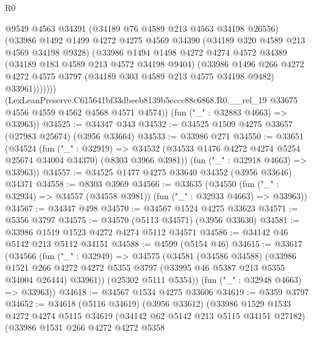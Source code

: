 \begin{lexlean}{R0}
\begin{coremodule}
                @9549
                @4563
                @34391
                (@34189 @76 @4589 @213 @4563 @34198 @26556)
                (@33986
                  @1492
                  @1499
                  @4272
                  @4275
                  @4569
                  @34390
                  (@34189 @320 @4589 @213 @4569 @34198 @9328)
                  (@33986
                    @1494
                    @1498
                    @4272
                    @4274
                    @4572
                    @34389
                    (@34189 @183 @4589 @213 @4572 @34198 @9404)
                    (@33986
                      @1496
                      @266
                      @4272
                      @4272
                      @4575
                      @3797
                      (@34189 @303 @4589 @213 @4575 @34198 @9482)
                      @33961)))))))
        (LexLeanPreserve.C615641bf33dbeeb8139b5cccc88c6868.R0.__rel_19
          @33675
          @4556
          @4559
          @4562
          @4568
          @4571
          @4574))
      (fun ("_" : @32883 @4663) => @33963))
@34525 := @34347 @343
@34532 := @34525 @1509 @4275 @33657 (@27983 @25674) (@3956 @33664)
@34533 := @33986 @271
@34550 := @33651
    (@34524
      (fun ("_" : @32919) =>
      @34532 (@34533 @1476 @4272 @4274 @5254 @25674 @34004 @34370) (@8303 @3966 @3981))
      (fun ("_" : @32918 @4663) => @33963))
@34557 := @34525 @1477 @4275 @33640 @34352 (@3956 @33646) @34371
@34558 := @8303 @3969
@34566 := @33635
    (@34550 (fun ("_" : @32934) => @34557 (@34558 @3981)) (fun ("_" : @32933 @4663) => @33963))
@34567 := @34347 @498
@34570 := @34567 @1524 @4275 @33623
@34571 := @5356 @3797
@34575 := @34570 (@5113 @34571) (@3956 @33630)
@34581 := @33986 @1519 @1523 @4272 @4274 @5112 @34571
@34586 := @34142 @46 @5142 @213 @5112 @34151
@34588 := @4599 (@5154 @46)
@34615 := @33617
    (@34566
      (fun ("_" : @32949) =>
      @34575
        (@34581
          (@34586 @34588)
          (@33986
            @1521
            @266
            @4272
            @4272
            @5355
            @3797
            (@33995 @46 @5387 @213 @5355 @34004 @26444)
            @33961))
        (@25302 @5111 @5354))
      (fun ("_" : @32948 @4663) => @33963))
@34618 := @34567 @1534 @4275 @33606
@34619 := @5359 @3797
@34652 := @34618
    (@5116 @34619)
    (@3956 @33612)
    (@33986
      @1529
      @1533
      @4272
      @4274
      @5115
      @34619
      (@34142 @62 @5142 @213 @5115 @34151 @27182)
      (@33986
        @1531
        @266
        @4272
        @4272
        @5358

\end{coremodule}
\end{lexlean}
